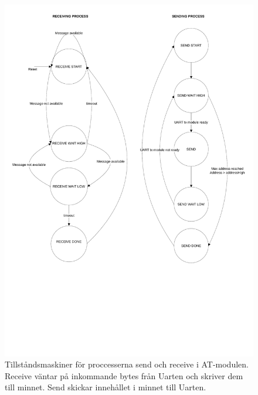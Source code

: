 \documentclass[a4paper]{scrartcl}
\begin{document}
		\begin{figure}[H]
			\centering
			\includegraphics[scale=0.4]{atprocessess.pdf}
			\caption{Tillståndsmaskiner för proccesserna send och receive i AT-modulen. Receive väntar på inkommande bytes från Uarten och skriver dem till minnet. Send skickar innehållet i minnet till Uarten.}
		\end{figure}
\end{document}
